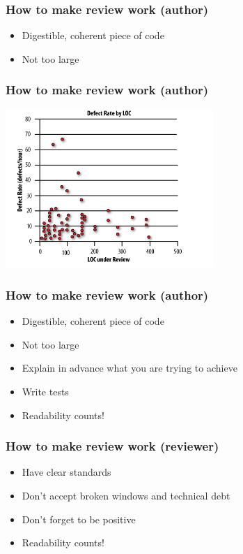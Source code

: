 \documentclass{beamer}
\begin{document}
\begin{frame}
\frametitle{How to make review work (author)}
\begin{itemize}
\pause
\item 
 Digestible, coherent piece of code
\pause
\item
Not too large
\end{itemize}
\end{frame}


\begin{frame}
\frametitle{How to make review work (author)}
\includegraphics[height=6cm]{figures/small_code_review.png}
\end{frame}


\begin{frame}
\frametitle{How to make review work (author)}
\begin{itemize}
\item 
 Digestible, coherent piece of code
\item
Not too large
\pause
\item
 Explain in advance what you are trying to achieve
\pause
\item 
 Write tests
\pause
\item
 Readability counts!\footnotemark[1]
\end{itemize}
\end{frame}

\begin{frame}
\frametitle{How to make review work (reviewer)}
\begin{itemize}
\pause
\item 
Have clear standards
\pause 
\item 
Don't accept broken windows and technical debt
\pause
\item 
Don't forget to be positive
\pause
\item 
Readability counts! 
\end{itemize}
\end{frame}
\end{document}
